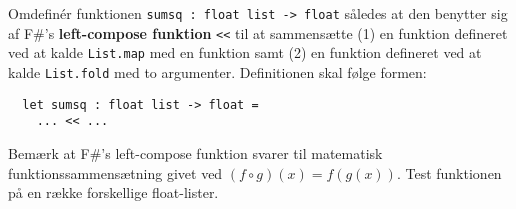 Omdefinér funktionen \lstinline{sumsq : float list -> float} således
at den benytter sig af F\#'s \textbf{left-compose
funktion} \lstinline{<<} til at sammensætte (1) en funktion defineret
ved at kalde \lstinline{List.map} med en funktion samt (2) en funktion
defineret ved at kalde \lstinline{List.fold} med to
argumenter. Definitionen skal følge formen:
\begin{lstlisting}
  let sumsq : float list -> float =
    ... << ...
\end{lstlisting}
Bemærk at F\#'s left-compose funktion svarer til matematisk funktionssammensætning givet ved $(f \circ g)(x) = f(g(x))$.
%
Test funktionen på en række forskellige float-lister.
